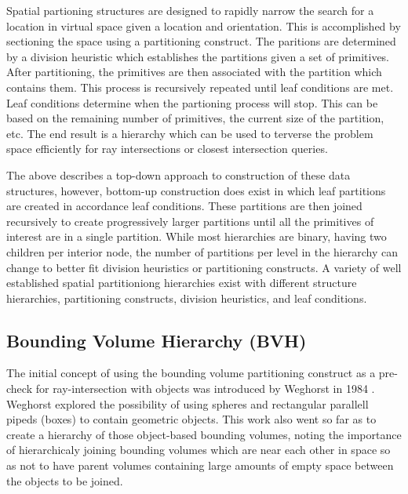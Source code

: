\documentclass[10pt, a4paper]{article}
\begin{document}
Spatial partioning structures are designed to rapidly narrow the search for a location in virtual space given a location and orientation. This is accomplished by sectioning the space using a partitioning construct. The paritions are determined by a division heuristic which establishes the partitions given a set of primitives. After partitioning, the primitives are then associated with the partition which contains them. This process is recursively repeated until leaf conditions are met. Leaf conditions determine when the partioning process will stop. This can be based on the remaining number of primitives, the current size of the partition, etc. The end result is a hierarchy which can be used to terverse the problem space efficiently for ray intersections or closest intersection queries. 

The above describes a top-down approach to construction of these data structures, however, bottom-up construction does exist in which leaf partitions are created in accordance leaf conditions. These partitions are then joined recursively to create progressively larger partitions until all the primitives of interest are in a single partition. While most hierarchies are binary, having two children per interior node, the number of partitions per level in the hierarchy can change to better fit division heuristics or partitioning constructs. A variety of well established spatial partitioniong hierarchies exist with different structure hierarchies, partitioning constructs, division heuristics, and leaf conditions.

 
\subsection{Bounding Volume Hierarchy (BVH)}

The initial concept of using the bounding volume partitioning construct as a pre-check for ray-intersection with objects was introduced by Weghorst in 1984 \cite{Weghorst:1984:ICM}. Weghorst explored the possibility of using spheres and rectangular parallell pipeds (boxes) to contain geometric objects. This work also went so far as to create a hierarchy of those object-based bounding volumes, noting the importance of hierarchicaly joining bounding volumes which are near each other in space so as not to have parent volumes containing large amounts of empty space between the objects to be joined.
\end{document}
